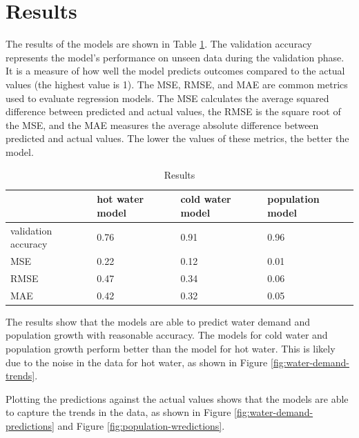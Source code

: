 \documentclass{article}
\begin{document}
\section{Results}

The results of the models are shown in Table \ref{tab:results}. The validation accuracy represents the model's performance on unseen data during the validation phase. It is a measure of how well the model predicts outcomes compared to the actual values (the highest value is 1). The MSE, RMSE, and MAE are common metrics used to evaluate regression models. The MSE calculates the average squared difference between predicted and actual values, the RMSE is the square root of the MSE, and the MAE measures the average absolute difference between predicted and actual values. The lower the values of these metrics, the better the model.

\begin{table}[!ht]
    \centering
    \begin{tabular}{llll}
        \hline
        ~                   & hot water model & cold water model & population model \\ \hline
        validation accuracy & 0.76            & 0.91             & 0.96             \\
        MSE                 & 0.22            & 0.12             & 0.01             \\
        RMSE                & 0.47            & 0.34             & 0.06             \\
        MAE                 & 0.42            & 0.32             & 0.05             \\ \hline
    \end{tabular}
    \caption{Results}
    \label{tab:results}
\end{table}

The results show that the models are able to predict water demand and population growth with reasonable accuracy. The models for cold water and population growth perform better than the model for hot water. This is likely due to the noise in the data for hot water, as shown in Figure \ref{fig:water-demand-trends}.

Plotting the predictions against the actual values shows that the models are able to capture the trends in the data, as shown in Figure \ref{fig:water-demand-predictions} and Figure \ref{fig:population-wredictions}.
\end{document}
